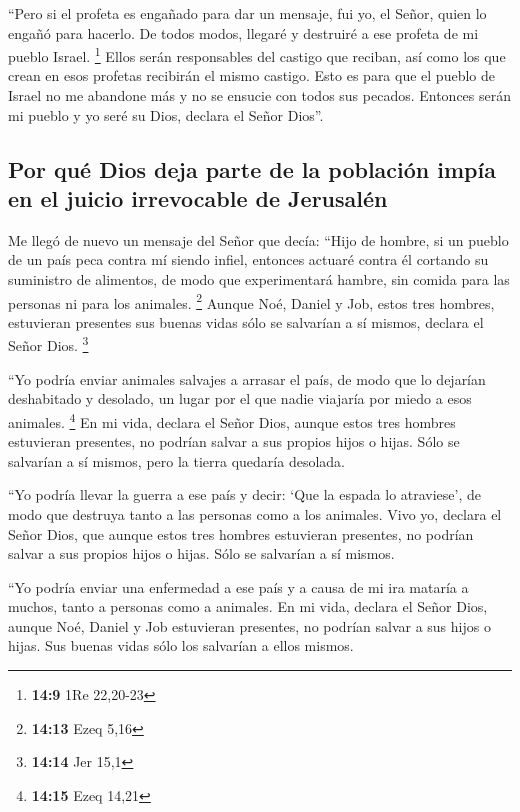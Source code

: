  ``Pero si el profeta es engañado para dar un mensaje, fui
yo, el Señor, quien lo engañó para hacerlo. De todos modos, llegaré y
destruiré a ese profeta de mi pueblo Israel. \footnote{\textbf{14:9} 1Re
  22,20-23}  Ellos serán responsables del castigo que
reciban, así como los que crean en esos profetas recibirán el mismo
castigo.  Esto es para que el pueblo de Israel no me
abandone más y no se ensucie con todos sus pecados. Entonces serán mi
pueblo y yo seré su Dios, declara el Señor Dios''.

\hypertarget{por-quuxe9-dios-deja-parte-de-la-poblaciuxf3n-impuxeda-en-el-juicio-irrevocable-de-jerusaluxe9n}{%
\subsection{Por qué Dios deja parte de la población impía en el juicio
irrevocable de
Jerusalén}\label{por-quuxe9-dios-deja-parte-de-la-poblaciuxf3n-impuxeda-en-el-juicio-irrevocable-de-jerusaluxe9n}}

 Me llegó de nuevo un mensaje del Señor que decía:
 ``Hijo de hombre, si un pueblo de un país peca contra mí
siendo infiel, entonces actuaré contra él cortando su suministro de
alimentos, de modo que experimentará hambre, sin comida para las
personas ni para los animales. \footnote{\textbf{14:13} Ezeq 5,16}
 Aunque Noé, Daniel y Job, estos tres hombres, estuvieran
presentes sus buenas vidas sólo se salvarían a sí mismos, declara el
Señor Dios. \footnote{\textbf{14:14} Jer 15,1}

 ``Yo podría enviar animales salvajes a arrasar el país,
de modo que lo dejarían deshabitado y desolado, un lugar por el que
nadie viajaría por miedo a esos animales. \footnote{\textbf{14:15} Ezeq
  14,21}  En mi vida, declara el Señor Dios, aunque estos
tres hombres estuvieran presentes, no podrían salvar a sus propios hijos
o hijas. Sólo se salvarían a sí mismos, pero la tierra quedaría
desolada.

 ``Yo podría llevar la guerra a ese país y decir: `Que la
espada lo atraviese', de modo que destruya tanto a las personas como a
los animales.  Vivo yo, declara el Señor Dios, que aunque
estos tres hombres estuvieran presentes, no podrían salvar a sus propios
hijos o hijas. Sólo se salvarían a sí mismos.

 ``Yo podría enviar una enfermedad a ese país y a causa
de mi ira mataría a muchos, tanto a personas como a animales.
 En mi vida, declara el Señor Dios, aunque Noé, Daniel y
Job estuvieran presentes, no podrían salvar a sus hijos o hijas. Sus
buenas vidas sólo los salvarían a ellos mismos.

